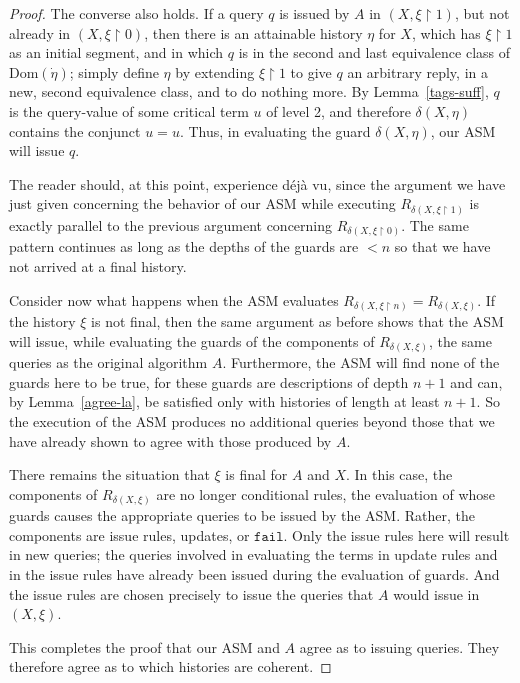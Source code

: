 \documentclass{LMCS}
\theoremstyle{definition}
\newcommand{\ans}{\dot}
\newcommand{\dom}[1]{\ensuremath{{\text{Dom}}(#1)}}
\newcommand{\restr}{\mathop{\upharpoonright}}
\newcommand{\ttt}[1]{\ensuremath{\mathtt {#1}}}
\begin{document}
\begin{proof}
The converse also holds.  If a query $q$ is issued by $A$ in
$(X,\xi\restr1)$, but not already in $(X,\xi\restr0)$, then there is
an attainable history $\eta$ for $X$, which has $\xi\restr1$ as an
initial segment, and in which $q$ is in the second and
last equivalence class of $\dom{\ans\eta}$; simply define $\eta$ by
extending $\xi\restr1$ to give $q$ an arbitrary reply, in a new,
second equivalence class, and to do nothing more.
By Lemma~\ref{tags-suff}, $q$ is the query-value of some critical term
$u$ of level 2, and therefore $\delta(X,\eta)$ contains the conjunct
$u=u$.  Thus, in evaluating the guard $\delta(X,\eta)$, our ASM will
issue $q$.

The reader should, at this point, experience d\'ej\`a vu, since the
argument we have just given concerning the behavior of our ASM while
executing $R_{\delta(X,\xi\restr1)}$ is exactly parallel to the
previous argument concerning $R_{\delta(X,\xi\restr0)}$.  The same
pattern continues as long as the depths of the guards are $<n$ so that
we have not arrived at a final history.

Consider now what happens when the ASM evaluates
$R_{\delta(X,\xi\restr n)}=R_{\delta(X,\xi)}$.  If the history $\xi$
is not final, then the same argument as before shows that the ASM will
issue, while evaluating the guards of the components of
$R_{\delta(X,\xi)}$, the same queries as the original algorithm $A$.
Furthermore, the ASM will find none of the guards here to be true, for
these guards are descriptions of depth $n+1$ and can, by
Lemma~\ref{agree-la}, be satisfied only with histories of length at
least $n+1$.  So the execution of the ASM produces no additional
queries beyond those that we have already shown to agree with those
produced by $A$.

There remains the situation that $\xi$ is final for $A$ and $X$.  In
this case, the components of $R_{\delta(X,\xi)}$ are no longer
conditional rules, the evaluation of whose guards causes the
appropriate queries to be issued by the ASM.  Rather, the components
are issue rules, updates, or \ttt{fail}.  Only the issue rules here
will result in new queries; the queries involved in evaluating the
terms in update rules and in the issue rules have already been issued
during the evaluation of guards.  And the issue rules are chosen
precisely to issue the queries that $A$ would issue in $(X,\xi)$.

This completes the proof that our ASM and $A$ agree as to issuing
queries.  They therefore agree as to which histories are coherent.


\end{proof}
\end{document}
